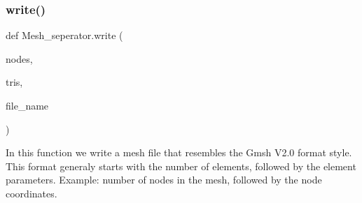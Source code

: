 \subsubsection{\texorpdfstring{write()}{write()}}
{\footnotesize\ttfamily def Mesh\+\_\+seperator.\+write (\begin{DoxyParamCaption}\item[{}]{nodes,  }\item[{}]{tris,  }\item[{}]{file\+\_\+name }\end{DoxyParamCaption})}

\begin{DoxyVerb}In this function we write a mesh file that resembles the Gmsh V2.0 format style.
This format generaly starts with the number of elements, followed by the element parameters.
Example: number of nodes in the mesh, followed by the node coordinates.
\end{DoxyVerb}
 